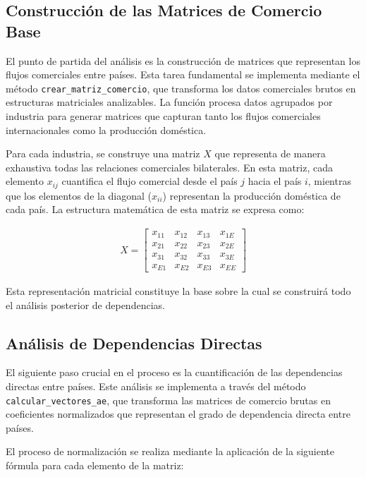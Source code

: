 \documentclass[authoryear]{elsarticle}
\begin{document}
\subsection{Construcción de las Matrices de Comercio Base}

El punto de partida del análisis es la construcción de matrices que representan los flujos comerciales entre países. Esta tarea fundamental se implementa mediante el método \texttt{crear\_matriz\_comercio}, que transforma los datos comerciales brutos en estructuras matriciales analizables. La función procesa datos agrupados por industria para generar matrices que capturan tanto los flujos comerciales internacionales como la producción doméstica.

Para cada industria, se construye una matriz $X$ que representa de manera exhaustiva todas las relaciones comerciales bilaterales. En esta matriz, cada elemento $x_{ij}$ cuantifica el flujo comercial desde el país $j$ hacia el país $i$, mientras que los elementos de la diagonal ($x_{ii}$) representan la producción doméstica de cada país. La estructura matemática de esta matriz se expresa como:

\begin{align*}
    X =
    \begin{bmatrix}
    x_{11} & x_{12} & x_{13} & x_{1E} \\
    x_{21} & x_{22} & x_{23} & x_{2E} \\
    x_{31} & x_{32} & x_{33} & x_{3E} \\
    x_{E1} & x_{E2} & x_{E3} & x_{EE}
    \end{bmatrix}
\end{align*}

Esta representación matricial constituye la base sobre la cual se construirá todo el análisis posterior de dependencias.

\subsection{Análisis de Dependencias Directas}

El siguiente paso crucial en el proceso es la cuantificación de las dependencias directas entre países. Este análisis se implementa a través del método \texttt{calcular\_vectores\_ae}, que transforma las matrices de comercio brutas en coeficientes normalizados que representan el grado de dependencia directa entre países.

El proceso de normalización se realiza mediante la aplicación de la siguiente fórmula para cada elemento de la matriz:
\end{document}

